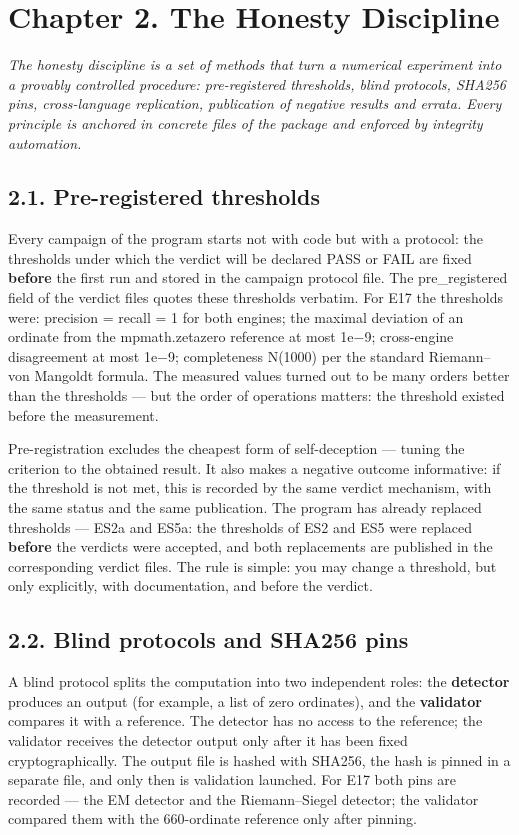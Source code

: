 \documentclass[11pt,a4paper]{article}
\begin{document}
\section{Chapter 2. The Honesty Discipline}

\noindent\textit{\color{copper}The honesty discipline is a set of methods that turn a numerical experiment into a provably controlled procedure: pre-registered thresholds, blind protocols, SHA256 pins, cross-language replication, publication of negative results and errata. Every principle is anchored in concrete files of the package and enforced by integrity automation.}

\subsection{2.1. Pre-registered thresholds}

Every campaign of the program starts not with code but with a protocol: the thresholds under which the verdict will be declared PASS or FAIL are fixed \textbf{before} the first run and stored in the campaign protocol file. The pre\_registered field of the verdict files quotes these thresholds verbatim. For E17 the thresholds were: precision = recall = 1 for both engines; the maximal deviation of an ordinate from the mpmath.zetazero reference at most 1e−9; cross-engine disagreement at most 1e−9; completeness N(1000) per the standard Riemann–von Mangoldt formula. The measured values turned out to be many orders better than the thresholds — but the order of operations matters: the threshold existed before the measurement.

Pre-registration excludes the cheapest form of self-deception — tuning the criterion to the obtained result. It also makes a negative outcome informative: if the threshold is not met, this is recorded by the same verdict mechanism, with the same status and the same publication. The program has already replaced thresholds — ES2a and ES5a: the thresholds of ES2 and ES5 were replaced \textbf{before} the verdicts were accepted, and both replacements are published in the corresponding verdict files. The rule is simple: you may change a threshold, but only explicitly, with documentation, and before the verdict.

\subsection{2.2. Blind protocols and SHA256 pins}

A blind protocol splits the computation into two independent roles: the \textbf{detector} produces an output (for example, a list of zero ordinates), and the \textbf{validator} compares it with a reference. The detector has no access to the reference; the validator receives the detector output only after it has been fixed cryptographically. The output file is hashed with SHA256, the hash is pinned in a separate file, and only then is validation launched. For E17 both pins are recorded — the EM detector and the Riemann–Siegel detector; the validator compared them with the 660-ordinate reference only after pinning.
\end{document}

